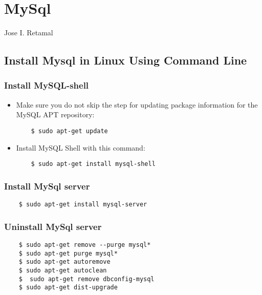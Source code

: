 \chapter{MySql}
Jose I. Retamal
\vskip 0.1in
\indent
\indent

\section{Install Mysql in Linux Using Command Line}	


\subsection{Install MySQL-shell}

\begin{itemize}
	
\item Make sure you do not skip the step for updating package information for the MySQL APT repository: 
	
	\begin{verbatim}
	$ sudo apt-get update
	\end{verbatim}
	
	\item Install MySQL Shell with this command: 
	
	\begin{verbatim}
	$ sudo apt-get install mysql-shell
	\end{verbatim}
\end{itemize}

\subsection{Install MySql server}

\begin{itemize}
	

	
	\begin{verbatim}
	$ sudo apt-get install mysql-server
	\end{verbatim}
	

\end{itemize}

\subsection{Uninstall MySql server}

\begin{itemize}
	
	
	
	\begin{verbatim}
	$ sudo apt-get remove --purge mysql*
	$ sudo apt-get purge mysql*
	$ sudo apt-get autoremove
	$ sudo apt-get autoclean
	$  sudo apt-get remove dbconfig-mysql
	$ sudo apt-get dist-upgrade
	\end{verbatim}
	
	
\end{itemize}

